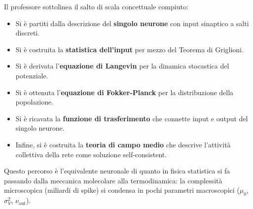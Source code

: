 Il professore sottolinea il salto di scala concettuale compiuto:

\begin{itemize}
    \item Si è partiti dalla descrizione del \textbf{singolo neurone} con input sinaptico a salti discreti.
    \item Si è costruita la \textbf{statistica dell'input} per mezzo del Teorema di Griglioni.
    \item Si è derivata l'\textbf{equazione di Langevin} per la dinamica stocastica del potenziale.
    \item Si è ottenuta l'\textbf{equazione di Fokker-Planck} per la distribuzione della popolazione.
    \item Si è ricavata la \textbf{funzione di trasferimento} che connette input e output del singolo neurone.
    \item Infine, si è costruita la \textbf{teoria di campo medio} che descrive l'attività collettiva della rete come soluzione self-consistent.
\end{itemize}

Questo percorso è l'equivalente neuronale di quanto in fisica statistica si fa passando dalla meccanica molecolare alla termodinamica: la complessità microscopica (miliardi di spike) si condensa in pochi parametri macroscopici ($\mu_0$, $\sigma_V^2$, $\nu_{\text{out}}$).
